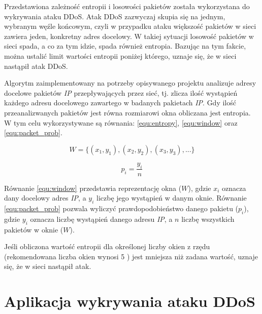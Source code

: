 Przedstawiona zależność entropii i losowości pakietów została wykorzystana do
wykrywania ataku DDoS. Atak DDoS zazwyczaj skupia się na jednym, wybranym węźle
końcowym, czyli w przypadku ataku większość pakietów w sieci zawiera jeden,
konkretny adres docelowy. W takiej sytuacji losowość pakietów w sieci spada, a
co za tym idzie, spada również entropia. Bazując na tym fakcie, można ustalić
limit wartości entropii poniżej którego, uznaje się, że w sieci nastąpił atak
DDoS. 

Algorytm zaimplementowany na potrzeby opisywanego projektu analizuje adresy
docelowe pakietów \textit{IP} przepływających przez sieć, tj. zlicza ilość
wystąpień każdego adresu docelowego zawartego w badanych pakietach \textit{IP}.
Gdy ilość przeanalizwanych pakietów jest równa rozmiarowi okna obliczana jest 
entropia. W tym celu wykorzystywane są równania: \ref{equ:entropy},
\ref{equ:window} oraz \ref{equ:packet_prob}. 

\begin{equation}
W = \{(x_{1},y_{1}),(x_{2},y_{2}),(x_{3},y_{3}),...\}
\label{equ:window}
\end{equation}

\begin{equation}
p_{i} = \frac{y_{i}}{n}
\label{equ:packet_prob}
\end{equation}

Równanie \ref{equ:window} przedstawia reprezentację okna ($W$), gdzie $x_{i}$
oznacza dany docelowy adres \textit{IP}, a $y_{i}$ liczbę jego wystąpień w danym
oknie. Równanie \ref{equ:packet_prob} pozwala wyliczyć prawdopodobieństwo
danego pakietu ($p_{i}$), gdzie $y_{i}$ oznacza liczbę wystąpień danego adresu
\textit{IP}, a $n$ liczbę wszystkich pakietów w oknie ($W$).

Jeśli obliczona wartość entropii dla określonej liczby okien z rzędu
(rekomendowana liczba okien  wynosi 5 \cite{mainddosarticle}) jest mniejsza niż
zadana wartość, uznaje się, że w sieci nastąpił atak. 

\section{Aplikacja wykrywania ataku DDoS}

